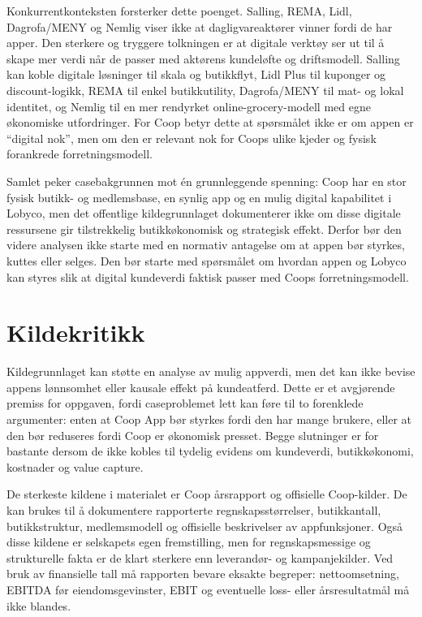 \documentclass[12pt,a4paper]{article}
\begin{document}
Konkurrentkonteksten forsterker dette poenget. Salling, REMA, Lidl, Dagrofa/MENY og Nemlig viser ikke at dagligvareaktører vinner fordi de har apper. Den sterkere og tryggere tolkningen er at digitale verktøy ser ut til å skape mer verdi når de passer med aktørens kundeløfte og driftsmodell. Salling kan koble digitale løsninger til skala og butikkflyt, Lidl Plus til kuponger og discount-logikk, REMA til enkel butikkutility, Dagrofa/MENY til mat- og lokal identitet, og Nemlig til en mer rendyrket online-grocery-modell med egne økonomiske utfordringer. For Coop betyr dette at spørsmålet ikke er om appen er ``digital nok'', men om den er relevant nok for Coops ulike kjeder og fysisk forankrede forretningsmodell.

Samlet peker casebakgrunnen mot én grunnleggende spenning: Coop har en stor fysisk butikk- og medlemsbase, en synlig app og en mulig digital kapabilitet i Lobyco, men det offentlige kildegrunnlaget dokumenterer ikke om disse digitale ressursene gir tilstrekkelig butikkøkonomisk og strategisk effekt. Derfor bør den videre analysen ikke starte med en normativ antagelse om at appen bør styrkes, kuttes eller selges. Den bør starte med spørsmålet om hvordan appen og Lobyco kan styres slik at digital kundeverdi faktisk passer med Coops forretningsmodell.

\section{Kildekritikk}

Kildegrunnlaget kan støtte en analyse av mulig appverdi, men det kan ikke bevise appens lønnsomhet eller kausale effekt på kundeatferd. Dette er et avgjørende premiss for oppgaven, fordi caseproblemet lett kan føre til to forenklede argumenter: enten at Coop App bør styrkes fordi den har mange brukere, eller at den bør reduseres fordi Coop er økonomisk presset. Begge slutninger er for bastante dersom de ikke kobles til tydelig evidens om kundeverdi, butikkøkonomi, kostnader og value capture.

De sterkeste kildene i materialet er Coop årsrapport og offisielle Coop-kilder. De kan brukes til å dokumentere rapporterte regnskapsstørrelser, butikkantall, butikkstruktur, medlemsmodell og offisielle beskrivelser av appfunksjoner. Også disse kildene er selskapets egen fremstilling, men for regnskapsmessige og strukturelle fakta er de klart sterkere enn leverandør- og kampanjekilder. Ved bruk av finansielle tall må rapporten bevare eksakte begreper: nettoomsetning, EBITDA før eiendomsgevinster, EBIT og eventuelle loss- eller årsresultatmål må ikke blandes.
\end{document}
